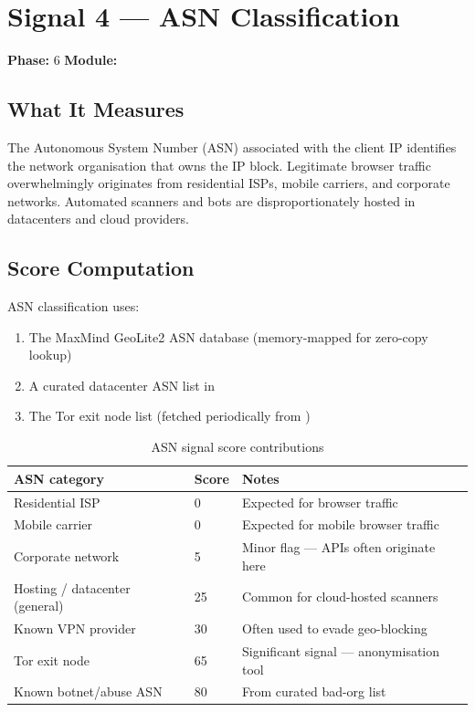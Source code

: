 \section{Signal 4 — ASN Classification}
\label{sig:asn}

\textbf{Phase:} 6 \quad \textbf{Module:} 

\subsection{What It Measures}

The Autonomous System Number (ASN) associated with the client IP identifies the network
organisation that owns the IP block. Legitimate browser traffic overwhelmingly originates
from residential ISPs, mobile carriers, and corporate networks. Automated scanners and
bots are disproportionately hosted in datacenters and cloud providers.

\subsection{Score Computation}

ASN classification uses:
\begin{enumerate}
  \item The MaxMind GeoLite2 ASN database (memory-mapped for zero-copy lookup)
  \item A curated datacenter ASN list in 
  \item The Tor exit node list (fetched periodically from )
\end{enumerate}

\begin{fullwidth}
\begin{table}[h]
\caption{ASN signal score contributions}
\label{tab:asn-scores}
\begin{tabular}{@{}llp{6cm}@{}}
\toprule
\textbf{ASN category} & \textbf{Score} & \textbf{Notes} \\
\midrule
Residential ISP & 0 & Expected for browser traffic \\
Mobile carrier & 0 & Expected for mobile browser traffic \\
Corporate network & 5 & Minor flag — APIs often originate here \\
Hosting / datacenter (general) & 25 & Common for cloud-hosted scanners \\
Known VPN provider & 30 & Often used to evade geo-blocking \\
Tor exit node & 65 & Significant signal — anonymisation tool \\
Known botnet/abuse ASN & 80 & From curated bad-org list \\
\bottomrule
\end{tabular}
\end{table}
\end{fullwidth}

